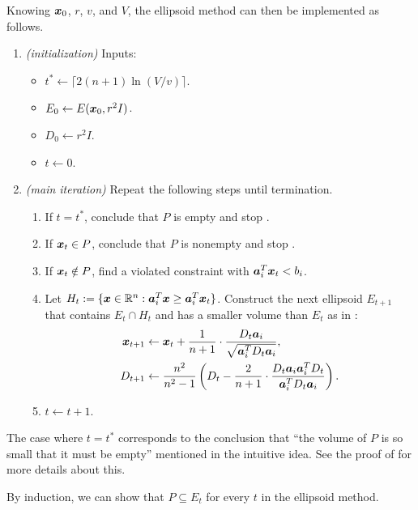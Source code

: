 \begin{enumerate}
Knowing \(\bm{x}_0\), \(r\), \(v\), and \(V\), the ellipsoid method can then
be implemented as follows.
\begin{enumerate}[label={(\arabic*)}]
\item \emph{(initialization)} Inputs:
\begin{itemize}
\item \(t^{*}\leftarrow\lceil 2(n+1)\ln(V/v)\rceil\).
\item \(E_0\leftarrow E(\bm{x}_0,r^{2}I)\).
\item \(D_0\leftarrow r^{2}I\).
\item \(t\leftarrow 0\).
\end{itemize}
\item \emph{(main iteration)} Repeat the following steps until termination.
\begin{enumerate}
\item If \(t=t^{*}\), conclude that \(P\) is empty and stop .
\item If \(\bm{x}_t\in P\), conclude that \(P\) is nonempty and stop
.
\item If \(\bm{x}_t\notin P\), find a violated constraint with
\(\bm{a}_i^{T}\bm{x}_t<b_i\).
\item Let
\(H_t:=\{\bm{x}\in\mathbb{R}^n:\bm{a}_i^{T}\bm{x}\ge\bm{a}_i^{T}\bm{x}_t\}\).
Construct the next ellipsoid \(E_{t+1}\) that contains \(E_t\cap H_t\) and has
a smaller volume than \(E_t\) as in :
\begin{align*}
\bm{x}_{t+1}&\leftarrow\bm{x}_{t}+\frac{1}{n+1}
\cdot \frac{D_t\bm{a}_i}{\sqrt{\bm{a}_i^{T}D_t\bm{a}_i}}, \\
D_{t+1}&\leftarrow\frac{n^{2}}{n^{2}-1}\left(D_t-\frac{2}{n+1}\cdot 
\frac{D_t\bm{a}_i\bm{a}_i^{T}D_t}{\bm{a}_i^{T}D_t\bm{a}_i}\right).
\end{align*}
\item \(t\leftarrow t+1\).
\end{enumerate}
\end{enumerate}
\begin{remark}
\item The case where \(t=t^{*}\) corresponds to the conclusion that ``the volume of
\(P\) is so small that it must be empty'' mentioned in the intuitive idea.  See
the proof of  for more details about this.
\item By induction, we can show that \(P\subseteq E_t\) for every \(t\) in the
ellipsoid method.


\end{remark}
\end{enumerate}
